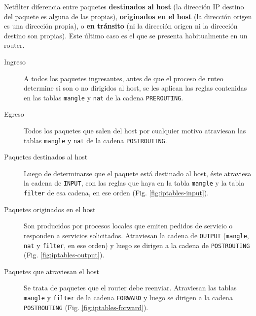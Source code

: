 Netfilter diferencia entre paquetes \textbf{destinados al host} (la dirección IP destino del paquete es alguna de las propias), \textbf{originados en el host} (la dirección origen es una dirección propia), o \textbf{en tránsito} (ni la dirección origen ni la dirección destino son propias). Este último caso es el que se presenta habitualmente en un router. 

\begin{description}
	\item[Ingreso] A todos los paquetes ingresantes, antes de que el proceso de ruteo determine si son o no dirigidos al host, se les aplican las reglas contenidas en las tablas \texttt{mangle} y \texttt{nat} de la cadena \texttt{PREROUTING}.
	\item[Egreso] Todos los paquetes que salen del host por cualquier motivo atraviesan las tablas \texttt{mangle} y \texttt{nat} de la cadena \texttt{POSTROUTING}. 
	\item[Paquetes destinados al host] Luego de determinarse que el paquete está destinado al host, éste atraviesa la cadena de \texttt{INPUT}, con las reglas que haya en la tabla \texttt{mangle} y la tabla \texttt{filter} de esa cadena, en ese orden (Fig. \ref{fig:iptables-input}). 
	\item[Paquetes originados en el host] Son producidos por procesos locales que emiten pedidos de servicio o responden a servicios solicitados. Atraviesan la cadena de \texttt{OUTPUT} (\texttt{mangle}, \texttt{nat} y \texttt{filter}, en ese orden) y luego se dirigen a la cadena de \texttt{POSTROUTING} (Fig. \ref{fig:iptables-output}). 
	\item[Paquetes que atraviesan el host] Se trata de paquetes que el router debe reenviar. Atraviesan las tablas \texttt{mangle} y \texttt{filter} de la cadena \texttt{FORWARD} y luego se dirigen a la cadena \texttt{POSTROUTING} (Fig. \ref{fig:iptables-forward}).
\end{description}


 
